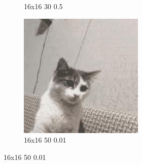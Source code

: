 \documentclass[12pt,a4paper]{article}
\begin{document}
\begin{figure}[H]
\begin{subfigure}{0.25\textwidth}
  \caption{16x16 30 0.5}
  \label{fig:4}
\end{subfigure}\hfil %
\begin{subfigure}{0.25\textwidth}
  \includegraphics[width=\linewidth]{images/small/16-16-50-001}
  \caption{16x16 50 0.01}
  \label{fig:5}
\end{subfigure}


\end{figure}
\end{document}
